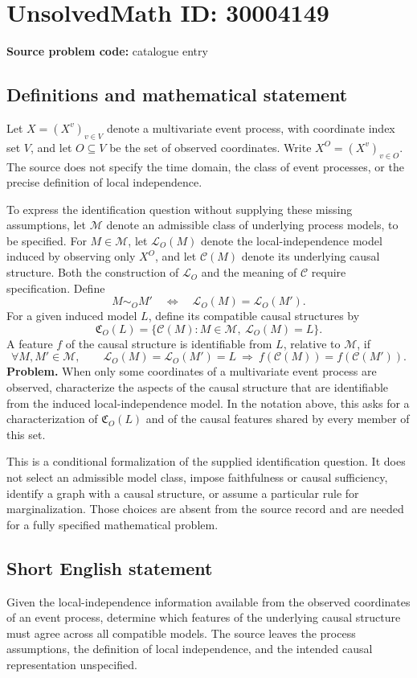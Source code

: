 \documentclass[11pt]{article}
\begin{document}
\section*{UnsolvedMath ID: 30004149}
\textbf{Source problem code:} catalogue entry
\subsection{Definitions and mathematical statement}
Let \(X=(X^v)_{v\in V}\) denote a multivariate event process, with coordinate index set \(V\), and let \(O\subseteq V\) be the set of observed coordinates. Write \(X^O=(X^v)_{v\in O}\). The source does not specify the time domain, the class of event processes, or the precise definition of local independence.

To express the identification question without supplying these missing assumptions, let \(\mathcal M\) denote an admissible class of underlying process models, to be specified. For \(M\in\mathcal M\), let \(\mathcal L_O(M)\) denote the local-independence model induced by observing only \(X^O\), and let \(\mathcal C(M)\) denote its underlying causal structure. Both the construction of \(\mathcal L_O\) and the meaning of \(\mathcal C\) require specification. Define
\[
M\sim_O M'\quad\Longleftrightarrow\quad
\mathcal L_O(M)=\mathcal L_O(M').
\]
For a given induced model \(L\), define its compatible causal structures by
\[
\mathfrak C_O(L)
=\{\mathcal C(M):M\in\mathcal M,\ \mathcal L_O(M)=L\}.
\]
A feature \(f\) of the causal structure is identifiable from \(L\), relative to \(\mathcal M\), if
\[
\forall M,M'\in\mathcal M,\qquad
\mathcal L_O(M)=\mathcal L_O(M')=L
\ \Longrightarrow\ 
f(\mathcal C(M))=f(\mathcal C(M')).
\]
\textbf{Problem.} When only some coordinates of a multivariate event process are observed, characterize the aspects of the causal structure that are identifiable from the induced local-independence model. In the notation above, this asks for a characterization of \(\mathfrak C_O(L)\) and of the causal features shared by every member of this set.

This is a conditional formalization of the supplied identification question. It does not select an admissible model class, impose faithfulness or causal sufficiency, identify a graph with a causal structure, or assume a particular rule for marginalization. Those choices are absent from the source record and are needed for a fully specified mathematical problem.
\subsection{Short English statement}
Given the local-independence information available from the observed coordinates of an event process, determine which features of the underlying causal structure must agree across all compatible models. The source leaves the process assumptions, the definition of local independence, and the intended causal representation unspecified.
\end{document}
